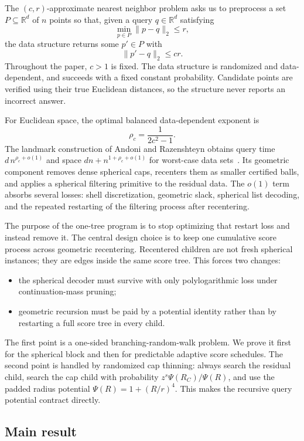 \documentclass[10pt]{article}
\theoremstyle{definition}
\newcommand{\R}{\mathbb{R}}
\begin{document}
The $(c,r)$-approximate nearest neighbor problem asks us to preprocess a set $P\subseteq\R^d$ of $n$ points so that, given a query $q\in\R^d$ satisfying
\[
   \min_{p\in P}\|p-q\|_2\le r,
\]
the data structure returns some $p'\in P$ with
\[
   \|p'-q\|_2\le cr.
\]
Throughout the paper, $c>1$ is fixed. The data structure is randomized and data-dependent, and succeeds with a fixed constant probability. Candidate points are verified using their true Euclidean distances, so the structure never reports an incorrect answer.

For Euclidean space, the optimal balanced data-dependent exponent is
\[
   \rho_c=\frac{1}{2c^2-1}.
\]
The landmark construction of Andoni and Razenshteyn obtains query time $d\,n^{\rho_c+o(1)}$ and space $dn+n^{1+\rho_c+o(1)}$ for worst-case data sets~\cite{AR15}. Its geometric component removes dense spherical caps, recenters them as smaller certified balls, and applies a spherical filtering primitive to the residual data. The $o(1)$ term absorbs several losses: shell discretization, geometric slack, spherical list decoding, and the repeated restarting of the filtering process after recentering.

The purpose of the one-tree program is to stop optimizing that restart loss and instead remove it. The central design choice is to keep one cumulative score process across geometric recentering. Recentered children are not fresh spherical instances; they are edges inside the same score tree. This forces two changes:
\begin{itemize}
   \item the spherical decoder must survive with only polylogarithmic loss under continuation-mass pruning;
   \item geometric recursion must be paid by a potential identity rather than by restarting a full score tree in every child.
\end{itemize}
The first point is a one-sided branching-random-walk problem. We prove it first for the spherical block and then for predictable adaptive score schedules. The second point is handled by randomized cap thinning: always search the residual child, search the cap child with probability $z^s\Psi(R_C)/\Psi(R)$, and use the padded radius potential $\Psi(R)=1+(R/r)^4$. This makes the recursive query potential contract directly.

\subsection{Main result}
\end{document}

